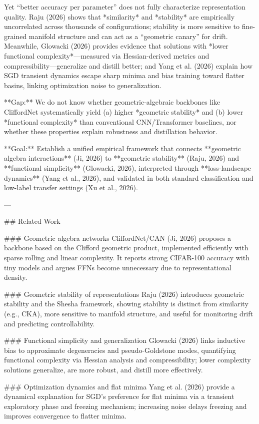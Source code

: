 Yet “better accuracy per parameter” does not fully characterize representation quality. Raju (2026) shows that *similarity* and *stability* are empirically uncorrelated across thousands of configurations; stability is more sensitive to fine-grained manifold structure and can act as a “geometric canary” for drift. Meanwhile, Glowacki (2026) provides evidence that solutions with *lower functional complexity*—measured via Hessian-derived metrics and compressibility—generalize and distill better; and Yang et al. (2026) explain how SGD transient dynamics escape sharp minima and bias training toward flatter basins, linking optimization noise to generalization.

**Gap:** We do not know whether geometric-algebraic backbones like CliffordNet systematically yield (a) higher *geometric stability* and (b) lower *functional complexity* than conventional CNN/Transformer baselines, nor whether these properties explain robustness and distillation behavior.

**Goal:** Establish a unified empirical framework that connects **geometric algebra interactions** (Ji, 2026) to **geometric stability** (Raju, 2026) and **functional simplicity** (Glowacki, 2026), interpreted through **loss-landscape dynamics** (Yang et al., 2026), and validated in both standard classification and low-label transfer settings (Xu et al., 2026).

---

## Related Work  

### Geometric algebra networks  
CliffordNet/CAN (Ji, 2026) proposes a backbone based on the Clifford geometric product, implemented efficiently with sparse rolling and linear complexity. It reports strong CIFAR-100 accuracy with tiny models and argues FFNs become unnecessary due to representational density.

### Geometric stability of representations  
Raju (2026) introduces geometric stability and the Shesha framework, showing stability is distinct from similarity (e.g., CKA), more sensitive to manifold structure, and useful for monitoring drift and predicting controllability.

### Functional simplicity and generalization  
Glowacki (2026) links inductive bias to approximate degeneracies and pseudo-Goldstone modes, quantifying functional complexity via Hessian analysis and compressibility; lower complexity solutions generalize, are more robust, and distill more effectively.

### Optimization dynamics and flat minima  
Yang et al. (2026) provide a dynamical explanation for SGD’s preference for flat minima via a transient exploratory phase and freezing mechanism; increasing noise delays freezing and improves convergence to flatter minima.

